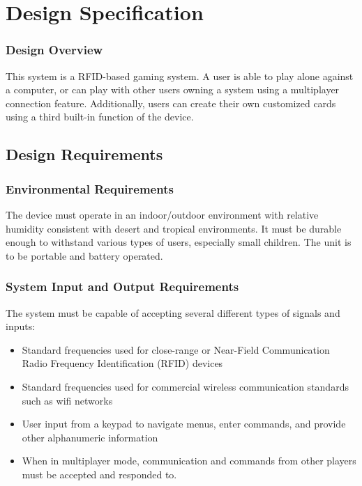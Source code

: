 \documentclass[12pt]{article} %
\begin{document}
\section{Design Specification}\label{sec:designSpec} 

\subsubsection{Design Overview}
This system is a RFID-based gaming system. A user is able to play alone against a computer, or can play with other users owning a system using a multiplayer connection feature. Additionally, users can create their own customized cards using a third built-in function of the device.

\subsection{Design Requirements}\label{sec:requirements} %
\subsubsection{Environmental Requirements}

The device must operate in an indoor/outdoor environment with relative
humidity consistent with desert and tropical environments. It must be durable
enough to withstand various types of users, especially small children.  The
unit is to be portable and battery operated.

\subsubsection{System Input and Output Requirements}

The system must be capable of accepting several different types of signals and inputs:

\begin{itemize}
	\item Standard frequencies used for close-range or Near-Field Communication Radio Frequency Identification (RFID) devices
	\item Standard frequencies used for commercial wireless communication standards such as wifi networks
	\item User input from a keypad to navigate menus, enter commands, and provide other alphanumeric information
	\item When in multiplayer mode, communication and commands from other players must be accepted and responded to.
\end{itemize}
\end{document}
